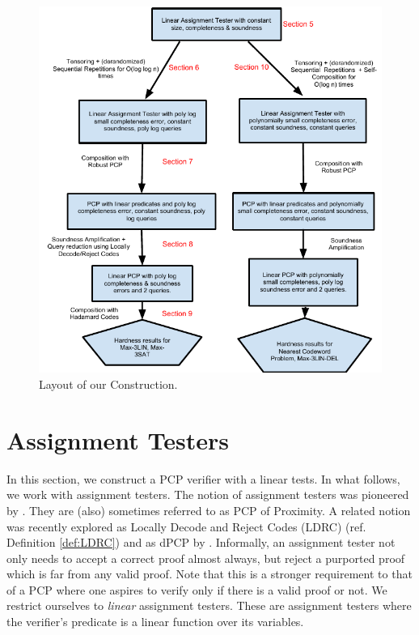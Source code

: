 \begin{figure}[hp]
\centering
\includegraphics{Layout}
\caption{Layout of our Construction.}
\label{figure:layout}
\end{figure}

\newpage

\section{Assignment Testers} \label{section:basic} In this section, we
construct a PCP verifier with a linear tests. In what follows, we work
with assignment testers. The notion of assignment testers was
pioneered by \cite{DR,BGHSV,S99}. They are (also) sometimes referred
to as PCP of Proximity. A related notion was recently explored as
Locally Decode and Reject Codes (LDRC) \cite{MR08} (ref. Definition
\ref{def:LDRC}) and as {\sf dPCP} by \cite{DH}.  Informally, an
assignment tester not only needs to accept a correct proof almost
always, but reject a purported proof which is far from any valid
proof. Note that this is a stronger requirement to that of a PCP where
one aspires to verify only if there is a valid proof or not. We
restrict ourselves to {\em linear} assignment testers. These are
assignment testers where the verifier's predicate is a linear function
over its variables.

